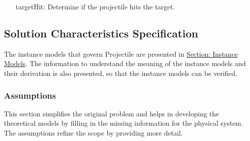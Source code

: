 \documentclass[12pt]{article}
\begin{document}
\begin{itemize}
\item[targetHit:\phantomsection\label{targetHit}]{Determine if the projectile hits the target.}
\end{itemize}
\subsection{Solution Characteristics Specification}
\label{Sec:SolCharSpec}
The instance models that govern Projectile are presented in \hyperref[Sec:IMs]{Section: Instance Models}. The information to understand the meaning of the instance models and their derivation is also presented, so that the instance models can be verified.

\subsubsection{Assumptions}
\label{Sec:Assumps}
This section simplifies the original problem and helps in developing the theoretical models by filling in the missing information for the physical system. The assumptions refine the scope by providing more detail.
\end{document}
